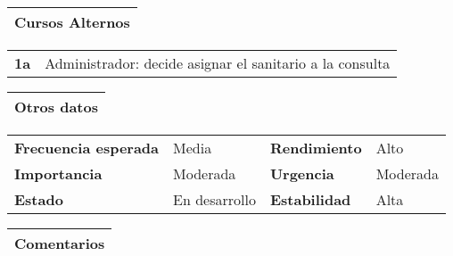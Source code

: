 \documentclass[11pt,a4paper]{article}
\begin{document}
\begin{table}[H]
	\begin{tabularx}{\textwidth}{X}
		\textbf{Cursos Alternos}\\ \hline
	\end{tabularx}
	
	\begin{tabularx}{\textwidth}{cX}
		\textbf{1a} & Administrador: decide asignar el sanitario a la consulta
	\end{tabularx}
\end{table}

\begin{table}[H]
	\begin{tabularx}{\textwidth}{X}
		\textbf{Otros datos}\\ \hline
	\end{tabularx}
	
	\begin{tabularx}{\textwidth}{lXlX}
		\textbf{Frecuencia esperada} & Media & \textbf{Rendimiento} & Alto\\
		\textbf{Importancia} & Moderada & \textbf{Urgencia} & Moderada \\
		\textbf{Estado} & En desarrollo & \textbf{Estabilidad} & Alta\\
	\end{tabularx}
	
	\begin{tabularx}{\textwidth}{X}
		\textbf{Comentarios}\\ \hline
	\end{tabularx}
\end{table}

\newpage


\end{document}
